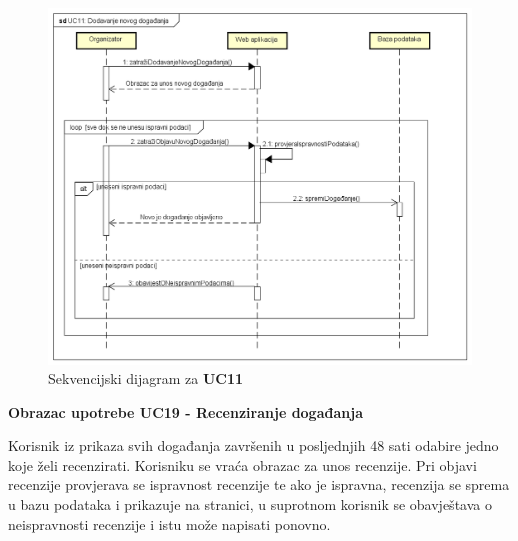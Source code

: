 				\begin{figure}[H]
					\includegraphics[width=\textwidth]{dijagrami/sd1.PNG}
					\centering
					\caption{Sekvencijski dijagram za \textbf{UC11}}
					\label{fig:promjene}
				\end{figure}
				
				\newpage
				
				\noindent \textbf{Obrazac upotrebe UC19 - Recenziranje događanja}
				
				\noindent Korisnik iz prikaza svih događanja završenih u posljednjih 48 sati odabire jedno koje želi recenzirati. Korisniku se vraća obrazac za unos recenzije. Pri objavi recenzije provjerava se ispravnost recenzije te ako je ispravna, recenzija se sprema u bazu podataka i prikazuje na stranici, u suprotnom korisnik se obavještava o neispravnosti recenzije i istu može napisati ponovno.
				
